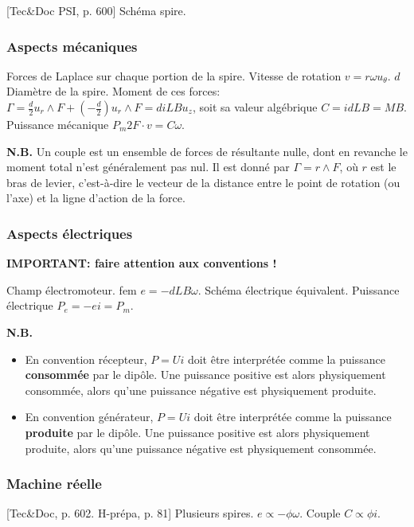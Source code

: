 \documentclass[11pt]{report}
\numberwithin{figure}{section}
\numberwithin{equation}{section}
\numberwithin{table}{section}
\newcommand{\1}{\boldsymbol{1}}
\begin{document}
[Tec\&Doc PSI, p. 600] Schéma spire.

\subsubsection{Aspects mécaniques}

Forces de Laplace sur chaque portion de la spire. Vitesse de rotation $v = r \omega u_\theta$. $d$ Diamètre de la spire. Moment de ces forces: $\Gamma = \frac{d}{2} u_r \wedge F + (-\frac{d}{2}) u_r \wedge F = d i L B u_z$, soit sa valeur algébrique $C =  i d L B = M B$. Puissance mécanique $P_m 2F \cdot v = C \omega$.

\textbf{N.B.} Un couple est un ensemble de forces de résultante nulle, dont en revanche le moment total n'est généralement pas nul. Il est donné par $\Gamma = r \wedge F$, où $r$ est le bras de levier, c'est-à-dire le vecteur de la distance entre le point de rotation (ou l'axe) et la ligne d'action de la force.

\subsubsection{Aspects électriques}

\textbf{IMPORTANT: faire attention aux conventions !}

Champ électromoteur. fem $e = - d L B \omega$. Schéma électrique équivalent. Puissance électrique $P_e = -e i = P_m$.

\textbf{N.B.}
\begin{itemize}
\item En convention récepteur, $P = Ui$ doit être interprétée comme la puissance \textbf{consommée} par le dipôle. Une puissance positive est alors physiquement consommée, alors qu’une puissance négative est physiquement produite.
\item En convention générateur, $P = Ui$ doit être interprétée comme la puissance \textbf{produite} par le dipôle. Une puissance positive est alors physiquement produite, alors qu’une puissance négative est physiquement consommée.
\end{itemize}

\subsubsection{Machine réelle}

[Tec\&Doc, p. 602. H-prépa, p. 81] Plusieurs spires. $e \propto - \phi \omega$. Couple $C \propto \phi i$. 
\end{document}
